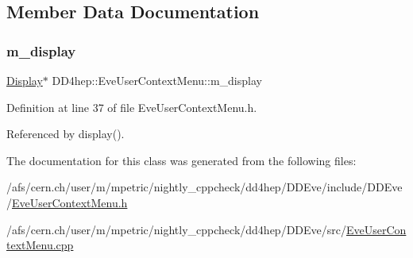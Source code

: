 \subsection{Member Data Documentation}
\hypertarget{class_d_d4hep_1_1_eve_user_context_menu_ab3592e822e14b2d25c4f68553df60cd0}{}\label{class_d_d4hep_1_1_eve_user_context_menu_ab3592e822e14b2d25c4f68553df60cd0} 
\subsubsection{\texorpdfstring{m\+\_\+display}{m\_display}}
{\footnotesize\ttfamily \hyperlink{class_d_d4hep_1_1_display}{Display}$\ast$ D\+D4hep\+::\+Eve\+User\+Context\+Menu\+::m\+\_\+display\hspace{0.3cm}{\ttfamily [protected]}}



Definition at line 37 of file Eve\+User\+Context\+Menu.\+h.



Referenced by display().



The documentation for this class was generated from the following files\+:\begin{DoxyCompactItemize}
\item 
/afs/cern.\+ch/user/m/mpetric/nightly\+\_\+cppcheck/dd4hep/\+D\+D\+Eve/include/\+D\+D\+Eve/\hyperlink{_eve_user_context_menu_8h}{Eve\+User\+Context\+Menu.\+h}\item 
/afs/cern.\+ch/user/m/mpetric/nightly\+\_\+cppcheck/dd4hep/\+D\+D\+Eve/src/\hyperlink{_eve_user_context_menu_8cpp}{Eve\+User\+Context\+Menu.\+cpp}\end{DoxyCompactItemize}
